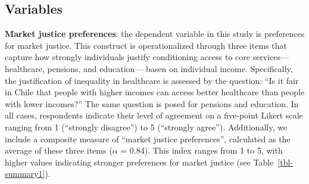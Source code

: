 \documentclass[
  12pt,
]{article}
\begin{document}
\subsection{Variables}\label{variables}

\textbf{Market justice preferences}: the dependent variable in this
study is preferences for market justice. This construct is
operationalized through three items that capture how strongly
individuals justify conditioning access to core services---healthcare,
pensions, and education--- basen on individual income. Specifically, the
justification of inequality in healthcare is assessed by the question:
``Is it fair in Chile that people with higher incomes can access better
healthcare than people with lower incomes?'' The same question is posed
for pensions and education. In all cases, respondents indicate their
level of agreement on a five-point Likert scale ranging from 1
(``strongly disagree'') to 5 (``strongly agree''). Additionally, we
include a composite measure of ``market justice preferences'',
calculated as the average of these three items (\(\alpha\) = 0.84). This
index ranges from 1 to 5, with higher values indicating stronger
preferences for market justice (see Table~\ref{tbl-summary1}).
\end{document}
